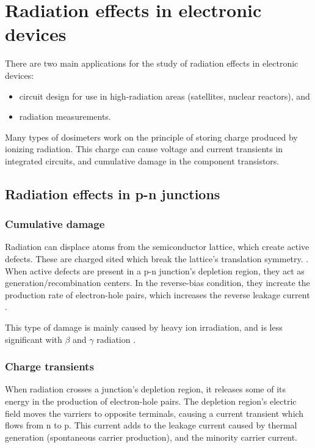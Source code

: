 \section{Radiation effects in electronic devices}
There are two main applications for the study of radiation effects in electronic devices:
\begin{itemize}
    \item circuit design for use in high-radiation areas (satellites, nuclear reactors), and
    \item radiation measurements.
\end{itemize}
Many types of dosimeters work on the principle of storing charge
produced by ionizing radiation.
This charge can cause voltage and current transients in integrated circuits,
and cumulative damage in the component transistors.

\subsection{Radiation effects in p-n junctions}
\subsubsection{Cumulative damage}
Radiation can displace atoms from the semiconductor lattice,
which create active defects.
These are charged sited which break the lattice's translation symmetry.
\cite{iniewski_radiation_2011}.
When active defects are present in a p-n junction's depletion region,
they act as generation/recombination centers.
In the reverse-bias condition, they increate the production rate of electron-hole pairs,
which increases the reverse leakage current
.

This type of damage is mainly caused by heavy ion irradiation,
and is less significant with $\beta$ and $\gamma$ radiation
\cite{knoll_radiation_2010}%
\cite{liu_electron_1971}.
\subsubsection{Charge transients}
\label{latchup}
When radiation crosses a junction's depletion region,
it releases some of its energy in the production of electron-hole pairs.
The depletion region's electric field
moves the varriers to opposite terminals,
causing a current transient which flows from n to p.
This current adds to the leakage current caused by thermal generation
(spontaneous carrier production),
and the minority carrier current.

